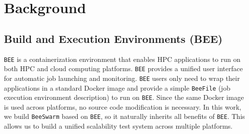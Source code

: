 

\section{Background}
\label{background}
\subsection{Build and Execution Environments (BEE)}
\texttt{BEE} \cite{bee,beeflow} is a %
containerization environment that enables HPC applications to run on both HPC and cloud computing platforms. \texttt{BEE} provides a unified user interface for automatic job launching and monitoring. \texttt{BEE} users only need to wrap their applications in a standard Docker image and provide a simple \texttt{BeeFile} (job execution environment description) to run on \texttt{BEE}. Since the same Docker image is used %
 across platforms, no source code modification is necessary. %
In this work, we build \texttt{BeeSwarm} based on \texttt{BEE}, so it naturally inherits all benefits of \texttt{BEE}. This allows us to build a unified scalability test system across multiple platforms. 



